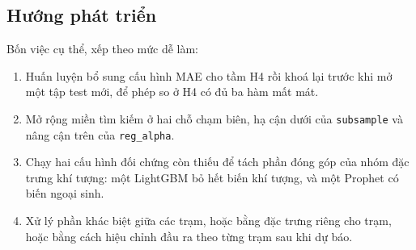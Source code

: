 \subsection{Hướng phát triển}

Bốn việc cụ thể, xếp theo mức dễ làm:

\begin{enumerate}
    \item Huấn luyện bổ sung cấu hình MAE cho tầm H4 rồi khoá lại trước khi mở một tập test
    mới, để phép so ở H4 có đủ ba hàm mất mát.
    \item Mở rộng miền tìm kiếm ở hai chỗ chạm biên, hạ cận dưới của \texttt{subsample} và
    nâng cận trên của \texttt{reg\_alpha}.
    \item Chạy hai cấu hình đối chứng còn thiếu để tách phần đóng góp của nhóm đặc trưng khí
    tượng: một LightGBM bỏ hết biến khí tượng, và một Prophet có biến ngoại sinh.
    \item Xử lý phần khác biệt giữa các trạm, hoặc bằng đặc trưng riêng cho trạm, hoặc bằng
    cách hiệu chỉnh đầu ra theo từng trạm sau khi dự báo.
\end{enumerate}

